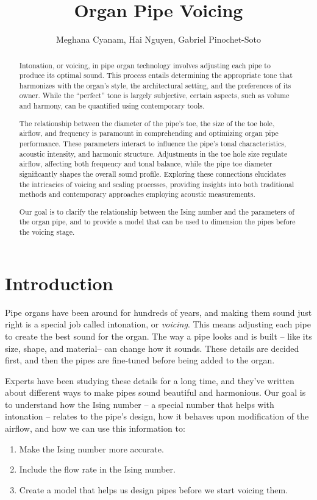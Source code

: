 \documentclass{psu-plan}
\title{Organ Pipe Voicing}
\author{ Meghana Cyanam, Hai Nguyen, Gabriel Pinochet-Soto }
\begin{document}
\maketitle

\begin{abstract}
    Intonation, or voicing, in pipe organ technology involves adjusting each
    pipe to produce its optimal sound.
    This process entails determining the appropriate tone that harmonizes with
    the organ’s style, the architectural setting, and the preferences of its
    owner.
    While the “perfect” tone is largely subjective, certain aspects, such as 
    volume and harmony, can be quantified using contemporary tools.
 
    The relationship between the diameter of the pipe’s toe, the size of the toe
    hole, airflow, and frequency is paramount in comprehending and optimizing
    organ pipe performance.
    These parameters interact to influence the pipe’s tonal characteristics,
    acoustic intensity, and harmonic structure. Adjustments in the toe hole size
    regulate airflow, affecting both frequency and tonal balance, while the pipe
    toe diameter significantly shapes the overall sound profile.
    Exploring these connections elucidates the intricacies of voicing and 
    scaling processes, providing insights into both traditional methods and
    contemporary approaches employing acoustic measurements.

    Our goal is to clarify the relationship between the Ising number and the
    parameters of the organ pipe, and to provide a model that can be used to
    dimension the pipes before the voicing stage.
\end{abstract}


\section{Introduction}

Pipe organs have been around for hundreds of years, and making them sound just
right is a special job called intonation, or \emph{voicing}.
This means adjusting each pipe to create the best sound for the organ.
The way a pipe looks and is built -- like its size, shape, and material-- can
change how it sounds.
These details are decided first, and then the pipes are fine-tuned before being
added to the organ.

Experts have been studying these details for a long time, and they’ve written
about different ways to make pipes sound beautiful and harmonious.
Our goal is to understand how the Ising number -- a special number that helps
with intonation -- relates to the pipe’s design, how it behaves upon modification of
the airflow, and how we can use this information to:
\begin{enumerate}
    \item Make the Ising number more accurate.
    \item Include the flow rate in the Ising number.
    \item Create a model that helps us design pipes before we start voicing them.
\end{enumerate}
\end{document}
